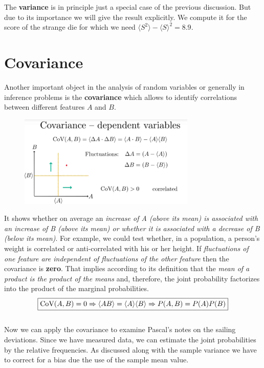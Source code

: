 \documentclass[12pt, a4paper]{scrartcl}
\begin{document}
The  \textbf{variance} is in principle just a special case of the previous discussion. But due to its importance we will give the result explicitly. We compute it for the score of the strange die for which we need $\langle S^2\rangle - \langle S\rangle ^2=8.9$.\\ 

\section*{Covariance}
Another important object in the analysis of random variables or generally in inference problems is the  \textbf{covariance} which allows to identify correlations between different features $A$ and $B$. 
\begin{figure}[H]
	\centering
	\includegraphics[width=0.75\textwidth]{3_11.png}
\end{figure}
It shows whether on average an \textit{increase of A (above its mean) is associated with an increase of B (above its mean) or whether it is associated with a decrease of B (below its mean)}. 
For example, we could test whether, in a population, a person's weight is correlated or anti-correlated with his or her height.
If \textit{fluctuations of one feature are independent of fluctuations of the other feature} then the covariance is  \textbf{zero}. 
That implies according to its definition that the \textit{mean of a product is the product of the means} and, therefore, the joint probability factorizes into the product of the marginal probabilities.
\begin{equation*}\boxed{\text{CoV}(A,B)=0 \Rightarrow \langle AB\rangle = \langle A\rangle\langle B\rangle \\
\Rightarrow P(A,B) = P(A)P(B)}\end{equation*}\\
Now we can apply the covariance to examine Pascal's notes on the sailing deviations. Since we have measured data, we can estimate the joint probabilities by the relative frequencies. As discussed along with the sample variance we have to correct for a bias due the use of the sample mean value.%
\end{document}
